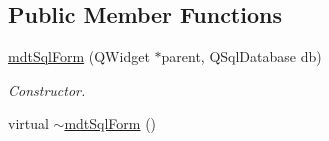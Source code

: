 \subsection*{Public Member Functions}
\begin{DoxyCompactItemize}
\item 
\hyperlink{classmdt_sql_form_a607993f0d35207668c0f220d77bd9298}{mdtSqlForm} (QWidget $\ast$parent, QSqlDatabase db)
\begin{DoxyCompactList}\small\item\em Constructor. \end{DoxyCompactList}\item 
\hypertarget{classmdt_sql_form_ab4538979323566433a20bb71118525a5}{
virtual \hyperlink{classmdt_sql_form_ab4538979323566433a20bb71118525a5}{$\sim$mdtSqlForm} ()}
\label{classmdt_sql_form_ab4538979323566433a20bb71118525a5}


\end{DoxyCompactItemize}
